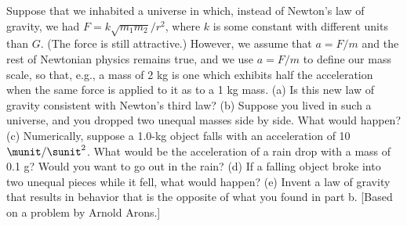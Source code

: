 Suppose that we inhabited a universe in which, instead
of Newton's law of gravity, we had $F=k\sqrt{m_1m_2}/r^2$, where $k$ is some
constant with different units than $G$. (The force is still
attractive.) However, we assume that $a=F/m$ and the rest of
Newtonian physics remains true, and we use $a=F/m$ to define
our mass scale, so that, e.g., a mass of 2 kg is one which
exhibits half the acceleration when the same force is
applied to it as to a 1 kg mass.\hwendpart
 (a) Is this new law of
gravity consistent with Newton's third law?\hwendpart
 (b) Suppose you
lived in such a universe, and you dropped two unequal masses
side by side. What would happen?\hwendpart
 (c) Numerically, suppose a
1.0-kg object falls with an acceleration of 10 $\munit/\sunit^2$. What
would be the acceleration of a rain drop with a mass of 0.1
g? Would you want to go out in the rain?\hwendpart
 (d) If a falling
object broke into two unequal pieces while it fell, what
would happen?\hwendpart
 (e) Invent a law of gravity that results in
behavior that is the opposite of what you found in part b.
[Based on a problem by Arnold Arons.]
